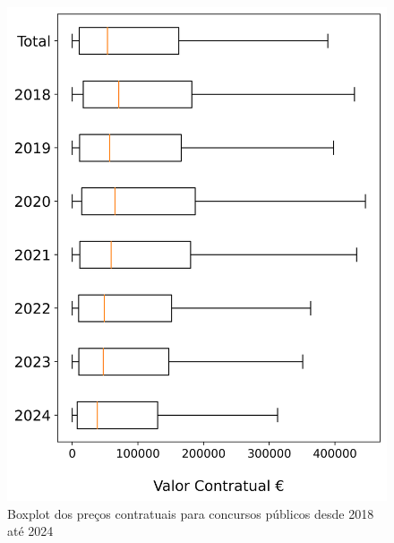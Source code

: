 \begin{figure}[H]
	\centering
	\begin{minipage}{0.31\linewidth}
		\includegraphics[width=\textwidth]{imagens/concpub_stat.png}
		\caption{Boxplot dos preços contratuais para concursos públicos desde 2018 até 2024}
		\label{fig:precocps}
	\end{minipage}
	\hfill
	\begin{minipage}{.31\linewidth}

\end{minipage}
\end{figure}
